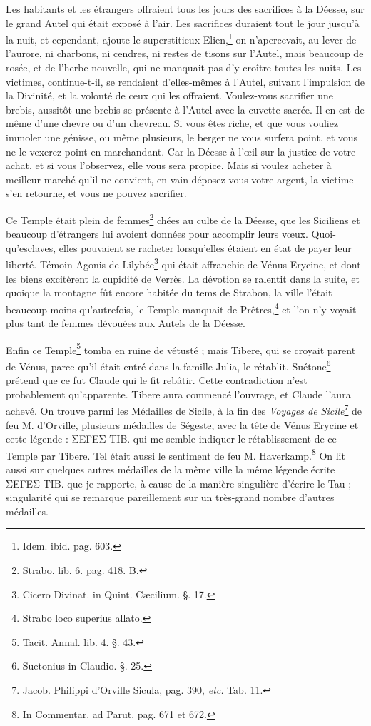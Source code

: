 \documentclass[a4paper, 18pt, oneside]{article}
\begin{document}
Les habitants et les étrangers offraient tous les jours des sacrifices à la Déesse, sur le grand Autel qui était exposé à l'air. Les sacrifices duraient tout le jour jusqu'à la nuit, et cependant, ajoute le superstitieux Elien,\footnote{Idem. ibid. pag. 603.} on n'apercevait, au lever de l'aurore, ni charbons, ni cendres, ni restes de tisons sur l'Autel, mais beaucoup de rosée, et de l'herbe nouvelle, qui ne manquait pas d'y croître toutes les nuits. Les victimes, continue-t-il, se rendaient d'elles-mêmes à l'Autel, suivant l'impulsion de la Divinité, et la volonté de ceux qui les offraient. Voulez-vous sacrifier une brebis, aussitôt une brebis se présente à l'Autel avec la cuvette sacrée. Il en est de même d'une chevre ou d'un chevreau. Si vous êtes riche, et que vous vouliez immoler une génisse, ou même plusieurs, le berger ne vous surfera point, et vous ne le vexerez point en marchandant. Car la Déesse à l'œil sur la justice de votre achat, et si vous l'observez, elle vous sera propice. Mais si voulez acheter à meilleur marché qu'il ne convient, en vain déposez-vous votre argent, la victime s'en retourne, et vous ne pouvez sacrifier.

Ce Temple était plein de femmes\footnote{Strabo. lib. 6. pag. 418. B.} chées au culte de la Déesse, que les Siciliens et beaucoup d'étrangers lui avoient données pour accomplir leurs vœux. Quoi-qu'esclaves, elles pouvaient se racheter lorsqu'elles étaient en état de payer leur liberté. Témoin Agonis de Lilybée\footnote{Cicero Divinat. in Quint. Cæcilium. §. 17.} qui était affranchie de Vénus Erycine, et dont les biens excitèrent la cupidité de Verrès. La dévotion se ralentit dans la suite, et quoique la montagne fût encore habitée du tems de Strabon, la ville l'était beaucoup moins qu'autrefois, le Temple manquait de Prêtres,\footnote{Strabo loco superius allato.} et l'on n'y voyait plus tant de femmes dévouées aux Autels de la Déesse.

Enfin ce Temple\footnote{Tacit. Annal. lib. 4. §. 43.} tomba en ruine de vétusté ; mais Tibere, qui se croyait parent de Vénus, parce qu'il était entré dans la famille Julia, le rétablit. Suétone\footnote{Suetonius in Claudio. §. 25.} prétend que ce fut Claude qui le fit rebâtir. Cette contradiction n'est probablement qu'apparente. Tibere aura commencé l'ouvrage, et Claude l'aura achevé. On trouve parmi les Médailles de Sicile, à la fin des \emph{Voyages de Sicile}\footnote{Jacob. Philippi d'Orville Sicula, pag. 390, \emph{etc.} Tab. 11.} de feu M. d'Orville, plusieurs médailles de Ségeste, avec la tête de Vénus Erycine et cette légende : ΣΕΓΕΣ ΤΙΒ. qui me semble indiquer le rétablissement de ce Temple par Tibere. Tel était aussi le sentiment de feu M. Haverkamp.\footnote{In Commentar. ad Parut. pag. 671 et 672.} On lit aussi sur quelques autres médailles de la même ville la même légende écrite ΣΕΓΕΣ ΤΙΒ. que je rapporte, à cause de la manière singulière d'écrire le Tau ; singularité qui se remarque pareillement sur un très-grand nombre d'autres médailles.
\end{document}
